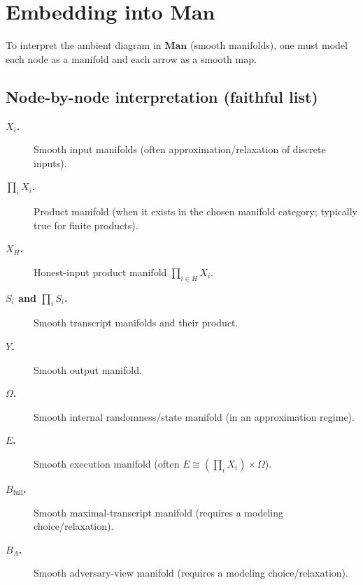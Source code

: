 \documentclass[11pt,a4paper]{article}
\theoremstyle{definition}
\theoremstyle{plain}
\begin{document}
\section{Embedding into \texorpdfstring{$\mathbf{Man}$}{Man}}
\label{sec:man}

To interpret the ambient diagram in $\mathbf{Man}$ (smooth manifolds), one must model each node as a manifold and each arrow as a smooth map.

\subsection{Node-by-node interpretation (faithful list)}
\begin{description}
    \item[\textbf{$X_i$.}] Smooth input manifolds (often approximation/relaxation of discrete inputs).
    \item[\textbf{$\prod_i X_i$.}] Product manifold (when it exists in the chosen manifold category; typically true for finite products).
    \item[\textbf{$X_H$.}] Honest-input product manifold $\prod_{i\in H}X_i$.
    \item[\textbf{$S_i$ and $\prod_i S_i$.}] Smooth transcript manifolds and their product.
    \item[\textbf{$Y$.}] Smooth output manifold.
    \item[\textbf{$\Omega$.}] Smooth internal randomness/state manifold (in an approximation regime).
    \item[\textbf{$E$.}] Smooth execution manifold (often $E\cong (\prod_i X_i)\times \Omega$).
    \item[\textbf{$B_{\mathrm{full}}$.}] Smooth maximal-transcript manifold (requires a modeling choice/relaxation).
    \item[\textbf{$B_A$.}] Smooth adversary-view manifold (requires a modeling choice/relaxation).
\end{description}
\end{document}
